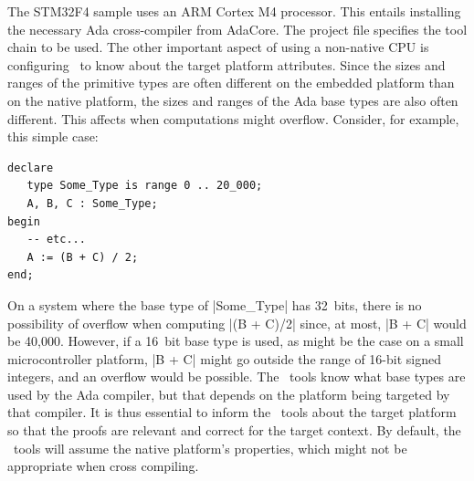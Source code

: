 The STM32F4 sample uses an ARM Cortex M4 processor. This entails installing the necessary Ada
cross-compiler from AdaCore. The project file specifies the tool chain to be used. The other
important aspect of using a non-native CPU is configuring \SPARK\ to know about the target
platform attributes. Since the sizes and ranges of the primitive types are often different on
the embedded platform than on the native platform, the sizes and ranges of the Ada base types
are also often different. This affects when computations might overflow. Consider, for example,
this simple case:

\begin{lstlisting}
declare
   type Some_Type is range 0 .. 20_000;
   A, B, C : Some_Type;
begin
   -- etc...
   A := (B + C) / 2;
end;
\end{lstlisting}

On a system where the base type of |Some_Type| has 32~bits, there is no possibility of overflow
when computing |(B + C)/2| since, at most, |B + C| would be 40,000. However, if a 16~bit base
type is used, as might be the case on a small microcontroller platform, |B + C| might go outside
the range of 16-bit signed integers, and an overflow would be possible. The \SPARK\ tools know
what base types are used by the Ada compiler, but that depends on the platform being targeted
by that compiler. It is thus essential to inform the \SPARK\ tools about the target platform so
that the proofs are relevant and correct for the target context. By default, the \SPARK\ tools
will assume the native platform's properties, which might not be appropriate when cross
compiling.


